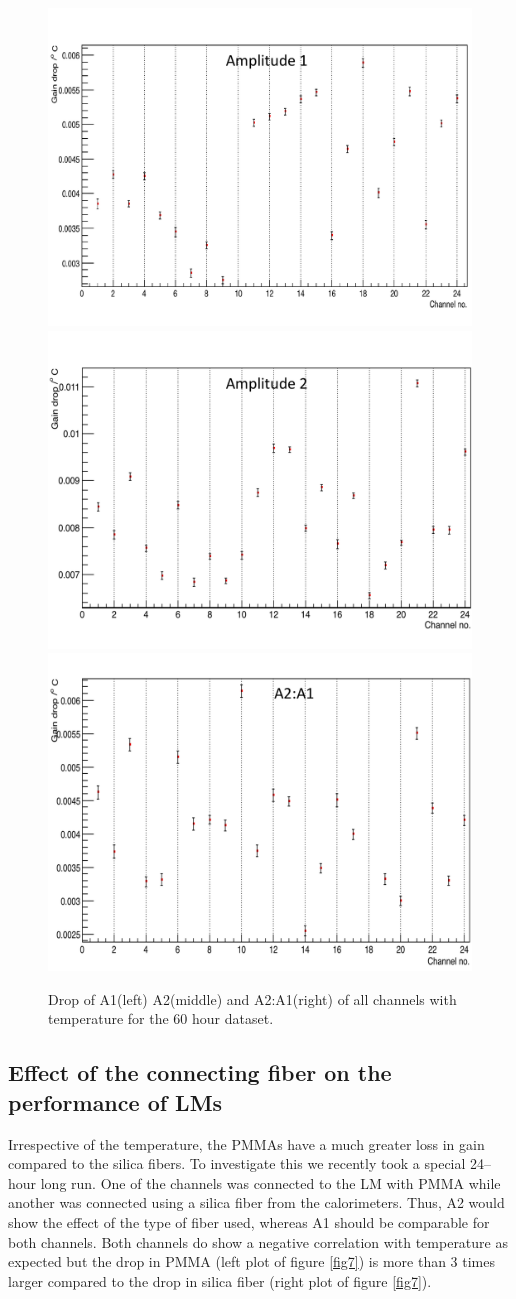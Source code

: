 \documentclass[article,accept,moreauthors,pdftex,10pt,a4paper]{Definitions/mdpi}
\begin{document}
\begin{figure}[H]
\centering
\includegraphics[width=5 cm]{All_amp1_temp_60hr.pdf}
\includegraphics[width=5 cm]{All_amp2_temp_60hr.pdf}
\includegraphics[width=5 cm]{All_a2_a1_temp_60hr.pdf}
\caption{\label{fig5}Drop of A1(left) A2(middle) and A2:A1(right) of all channels with temperature for the 60 hour dataset. }
\end{figure} 
\subsection{Effect of the connecting fiber on the performance of LMs}
Irrespective of the temperature, the PMMAs have a much greater loss in gain 
compared to the silica fibers. To investigate this we recently took a special 
24--hour long run. One of the channels was connected to the LM with 
PMMA while another was connected using a silica fiber from the 
calorimeters. Thus, A2 would show the effect of the type of 
fiber used, whereas A1 should be comparable for both channels. 
Both channels do show a negative correlation with temperature as 
expected but the drop in PMMA (left plot of figure \ref{fig7}) is more than 
3 times larger compared to the drop in silica fiber (right plot of figure \ref{fig7}).
\end{document}
